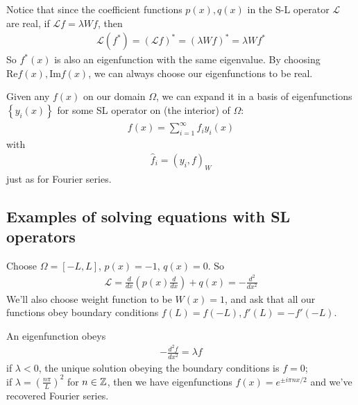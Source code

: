 \documentclass[a4paper]{article}
\begin{document}
Notice that since the coefficient functions $p\left(x\right),q\left(x\right)$ in the S-L operator $\mathcal{L}$ are real, if $\mathcal{L}f = \lambda Wf$, then
\begin{equation*}
\begin{aligned}
\mathcal{L} \left(f^*\right) = \left(\mathcal{L} f\right)^* = \left(\lambda W f\right)^* = \lambda W f^*
\end{aligned}
\end{equation*}
So $f^*\left(x\right)$ is also an eigenfunction with the same eigenvalue. By choosing $\text{Re} f\left(x\right), \text{Im} f\left(x\right)$, we can always choose our eigenfunctions to be real.

Given any $f\left(x\right)$ on our domain $\Omega$, we can expand it in a basis of eigenfunctions $\left\{y_i\left(x\right)\right\}$ for some SL operator on (the interior) of $\Omega$:
\begin{equation*}
\begin{aligned}
f\left(x\right) = \sum_{i=1}^\infty \hat{f}_i y_i\left(x\right)
\end{aligned}
\end{equation*}
with
\begin{equation*}
\begin{aligned}
\hat{f}_i = \left(y_i,f\right)_W
\end{aligned}
\end{equation*}
just as for Fourier series.

\subsection{Examples of solving equations with SL operators}

\begin{eg}
Choose $\Omega = \left[-L,L\right]$, $p\left(x\right) = -1$, $q\left(x\right) = 0$. So
\begin{equation*}
\begin{aligned}
\mathcal{L} = \frac{d}{dx} \left(p\left(x\right) \frac{d}{dx}\right) + q\left(x\right) = -\frac{d^2}{dx^2}
\end{aligned}
\end{equation*}
We'll also choose weight function to be $W\left(x\right) = 1$, and ask that all our functions obey boundary conditions $f\left(L\right) = f\left(-L\right), f'\left(L\right) = -f'\left(-L\right)$.

An eigenfunction obeys
\begin{equation*}
\begin{aligned}
-\frac{d^2 f}{dx^2} = \lambda f
\end{aligned}
\end{equation*}
if $\lambda < 0$, the unique solution obeying the boundary conditions is $f=0$;\\
if $\lambda = \left(\frac{n\pi}{L}\right)^2$ for $n \in \mathbb{Z}$, then we have eigenfunctions $f\left(x\right) = e^{\pm i\pi nx / 2}$ and we've recovered Fourier series.
\end{eg}
\end{document}
